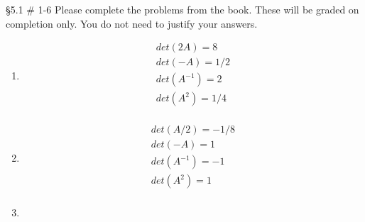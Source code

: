 \documentclass[]{exam}
\begin{document}
\begin{questions}
\begin{parts}
\begin{solution}
			\end{solution}	
	\end{parts}
	
	
	\question \S 5.1 \# 1-6 Please complete the problems from the book. These will be graded on completion only. You do not need to justify your answers.
	\begin{solution}
        \begin{enumerate}
            \item 
                \begin{gather*}
                    det(2A)=8 \\
                    det(-A)=1/2 \\
                    det(A^{-1})=2 \\
                    det(A^2)=1/4 \\
                \end{gather*}
            \item
                \begin{gather*}
                    det(A/2)=-1/8 \\
                    det(-A)=1 \\
                    det(A^{-1})=-1 \\
                    det(A^2)=1 \\
                \end{gather*}
            \item
\end{enumerate}
\end{solution}
\end{questions}
\end{document}
